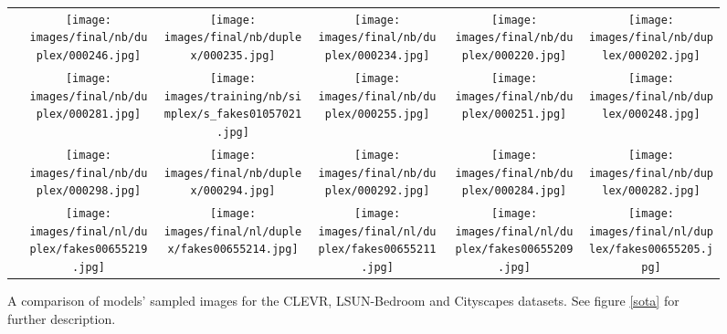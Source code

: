 \documentclass{article}
\begin{document}
\begin{figure*}[t]
\begin{tabular}{c c c c c c}
 & \texttt{[image: images/final/nb/duplex/000246.jpg]} & \texttt{[image: images/final/nb/duplex/000235.jpg]} & \texttt{[image: images/final/nb/duplex/000234.jpg]} & \texttt{[image: images/final/nb/duplex/000220.jpg]} & \texttt{[image: images/final/nb/duplex/000202.jpg]} \\

 & \texttt{[image: images/final/nb/duplex/000281.jpg]} & \texttt{[image: images/training/nb/simplex/s\_fakes01057021.jpg]} & \texttt{[image: images/final/nb/duplex/000255.jpg]} & \texttt{[image: images/final/nb/duplex/000251.jpg]} & \texttt{[image: images/final/nb/duplex/000248.jpg]} \\
\vspace*{8pt}

 & \texttt{[image: images/final/nb/duplex/000298.jpg]} & \texttt{[image: images/final/nb/duplex/000294.jpg]} & \texttt{[image: images/final/nb/duplex/000292.jpg]} & \texttt{[image: images/final/nb/duplex/000284.jpg]} & \texttt{[image: images/final/nb/duplex/000282.jpg]} \\

 & \texttt{[image: images/final/nl/duplex/fakes00655219.jpg]} & \texttt{[image: images/final/nl/duplex/fakes00655214.jpg]} & \texttt{[image: images/final/nl/duplex/fakes00655211.jpg]} & \texttt{[image: images/final/nl/duplex/fakes00655209.jpg]} & \texttt{[image: images/final/nl/duplex/fakes00655205.jpg]} \\

\end{tabular}
\caption{A comparison of models' sampled images for the CLEVR, LSUN-Bedroom and Cityscapes datasets. See figure \ref{sota} for further description.}
\end{figure*}
\end{document}
